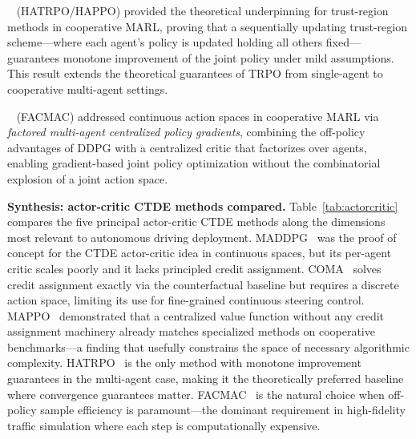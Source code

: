 \documentclass[12pt, a4paper]{article}
\begin{document}
\citeauthor{kuba2021hatrpo}~\cite{kuba2021hatrpo} (HATRPO/HAPPO) provided the
theoretical underpinning for trust-region methods in cooperative MARL,
proving that a sequentially updating trust-region scheme---where each agent's
policy is updated holding all others fixed---guarantees monotone improvement of
the joint policy under mild assumptions.  This result extends the theoretical
guarantees of TRPO from single-agent to cooperative multi-agent settings.

\citeauthor{peng2021facmac}~\cite{peng2021facmac} (FACMAC) addressed
continuous action spaces in cooperative MARL via \emph{factored multi-agent
centralized policy gradients}, combining the off-policy advantages of DDPG
with a centralized critic that factorizes over agents, enabling gradient-based
joint policy optimization without the combinatorial explosion of a joint
action space.

\smallskip\noindent\textbf{Synthesis: actor-critic CTDE methods compared.}
Table~\ref{tab:actorcritic} compares the five principal actor-critic CTDE methods
along the dimensions most relevant to autonomous driving deployment.
MADDPG~\cite{lowe2017multi} was the proof of concept for the CTDE actor-critic
idea in continuous spaces, but its per-agent critic scales poorly and it lacks
principled credit assignment.  COMA~\cite{foerster2018counterfactual} solves
credit assignment exactly via the counterfactual baseline but requires a discrete
action space, limiting its use for fine-grained continuous steering control.
MAPPO~\cite{yu2021surprising} demonstrated that a centralized value function
without any credit assignment machinery already matches specialized methods
on cooperative benchmarks---a finding that usefully constrains the space of
necessary algorithmic complexity.  HATRPO~\cite{kuba2021hatrpo} is the only
method with monotone improvement guarantees in the multi-agent case, making it
the theoretically preferred baseline where convergence guarantees matter.
FACMAC~\cite{peng2021facmac} is the natural choice when off-policy sample
efficiency is paramount---the dominant requirement in high-fidelity traffic
simulation where each step is computationally expensive.
\end{document}
